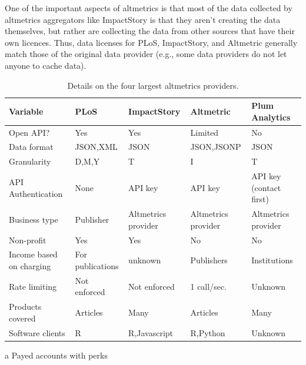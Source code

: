 \documentclass[letterpaper,superscriptaddress,showkeys,longbibliography]{revtex4-1}\usepackage{graphicx, color}
\begin{document}
One of the important aspects of altmetrics is that most of the data collected by altmetrics aggregators like ImpactStory is that they aren't creating the data themselves, but rather are collecting the data from other sources that have their own licences. Thus, data licenses for PLoS, ImpactStory, and Altmetric generally match those of the original data provider (e.g., some data providers do not let anyone to cache data). 


\begin{table}[!ht]
    \begin{threeparttable}[b]
    \caption{Details on the four largest altmetrics providers.}\label{tab:a} %
        \begin{tabular}{|l|l|l|l|l|}
            \hline
            Variable & PLoS & ImpactStory & Altmetric & Plum Analytics \\
            \hline
            Open API? & Yes & Yes & Limited\tnote{d} & No \\
            Data format & JSON,XML & JSON & JSON,JSONP & JSON \\
            Granularity\tnote{b} & D,M,Y & T & I & T \\
            API Authentication & None & API key & API key & API key (contact first) \\
            Business type & Publisher & Altmetrics provider & Altmetrics provider & Altmetrics provider \\
            Non-profit & Yes & Yes & No & No \\
            Income based on charging & For publications & unknown & Publishers & Institutions \\
            Rate limiting & Not enforced & Not enforced\tnote{c} & 1 call/sec.\tnote{d} & Unknown \\
            Products covered & Articles & Many\tnote{e} & Articles & Many\tnote{f} \\
            Software clients & R\tnote{g} & R,Javascript\tnote{h} & R,Python\tnote{i} & Unknown \\
            \hline
        \end{tabular}
        \begin{tablenotes}
            \item[a] Payed accounts with perks

\end{tablenotes}
\end{threeparttable}
\end{table}
\end{document}
